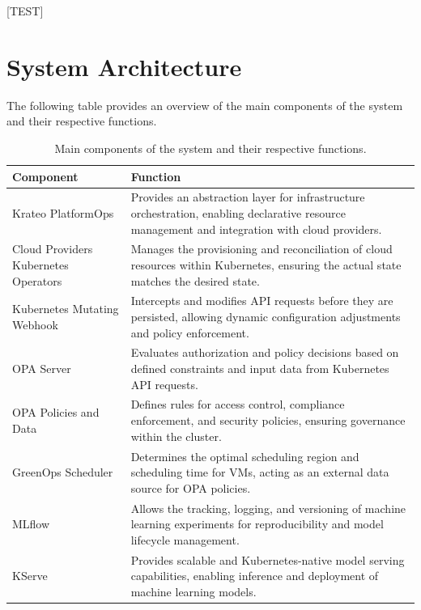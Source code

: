 [TEST]

\newpage
\section{System Architecture}
\label{sec:system_architecture}

The following table provides an overview of the main components of the system and their respective functions.

\begin{table}[H]
  \centering
  \renewcommand{\arraystretch}{1.3} %
  \begin{tabularx}{\textwidth}{| l | X |} %
    \hline
    \textbf{Component} & \textbf{Function} \\
    \hline
    Krateo PlatformOps & Provides an abstraction layer for infrastructure orchestration, enabling declarative resource management and integration with cloud providers. \\
    \hline
    Cloud Providers Kubernetes Operators & Manages the provisioning and reconciliation of cloud resources within Kubernetes, ensuring the actual state matches the desired state. \\
    \hline
    Kubernetes Mutating Webhook & Intercepts and modifies API requests before they are persisted, allowing dynamic configuration adjustments and policy enforcement. \\
    \hline
    OPA Server & Evaluates authorization and policy decisions based on defined constraints and input data from Kubernetes API requests. \\
    \hline
    OPA Policies and Data & Defines rules for access control, compliance enforcement, and security policies, ensuring governance within the cluster. \\
    \hline
    GreenOps Scheduler & Determines the optimal scheduling region and scheduling time for VMs, acting as an external data source for OPA policies. \\
    \hline
    MLflow & Allows the tracking, logging, and versioning of machine learning experiments for reproducibility and model lifecycle management. \\
    \hline
    KServe & Provides scalable and Kubernetes-native model serving capabilities, enabling inference and deployment of machine learning models. \\
    \hline
  \end{tabularx}
  \caption{Main components of the system and their respective functions.}
  \label{tab:system_components}
\end{table}






